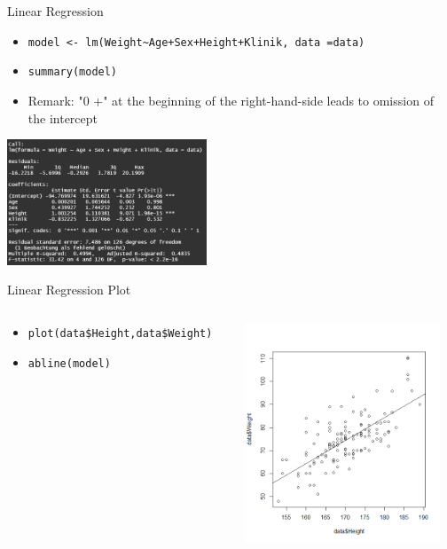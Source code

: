 \documentclass[xcolor=dvipsnames, aspectratio = 169]{beamer}
\begin{document}
\begin{frame}[fragile]{Linear Regression}
	\begin{itemize}
		\item \verb"model <- lm(Weight~Age+Sex+Height+Klinik, data =data)"
		\item \verb+summary(model)+
		\item Remark: "0 +" at the beginning of the right-hand-side leads to omission of the intercept
	\end{itemize}
			
	\begin{center}
		\includegraphics[height=3.75cm]{LinearRegressionSummary}
	\end{center}
\end{frame}

\begin{frame}[fragile]{Linear Regression Plot}
	\begin{columns}[T]
		\begin{column}{0.6\textwidth}
			\begin{itemize}
				\item \verb+plot(data$Height,data$Weight)+
				\item \verb+abline(model)+
			\end{itemize}
		\end{column}
		\begin{column}{0.4\textwidth}
			\includegraphics[height=6.5cm]{LinearRegressionPlot}
		\end{column}
	\end{columns}
\end{frame}
\end{document}
